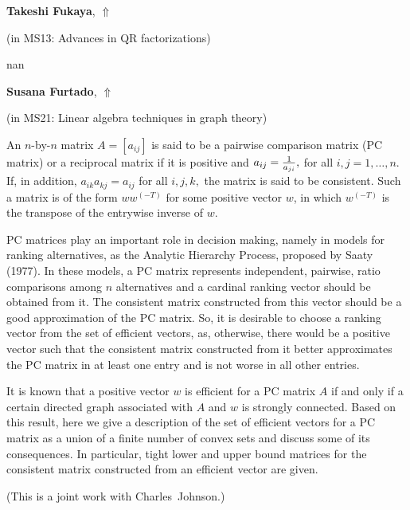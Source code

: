 \documentclass[ILAS2025-program.tex]{subfiles}
\begin{document}
     \hypertarget{down0340}{}\begin{ilasabstract}
    
    \textbf{Takeshi Fukaya},  \hfill \hyperlink{up0340}{$\Uparrow$}
    
    (in {\color{mstitle}MS13: Advances in QR factorizations})
        
        \mtskip
    nan\end{ilasabstract}
     \hypertarget{down0169}{}\begin{ilasabstract}
    
    \textbf{Susana Furtado},  \hfill \hyperlink{up0169}{$\Uparrow$}
    
    (in {\color{mstitle}MS21: Linear algebra techniques in graph theory})
        
        \mtskip
    An $n$-by-$n$ matrix $A=[a_{ij}]$ is said to be a pairwise comparison matrix (PC matrix)
or a reciprocal matrix if it is positive and $a_{ij}=\frac{1}{%
a_{ji}},$ for all $i,j=1,\ldots ,n.$ If, in addition, $a_{ik}a_{kj}=a_{ij}$ for
all $i,j,k,$ the matrix is said to be consistent. Such a matrix is of the
form $ww^{(-T)}$ for some positive vector $w$, in which $w^{(-T)}$ is the transpose of the entrywise
inverse of $w$.

PC matrices play an important role in decision making, namely in models for ranking
alternatives, as the Analytic Hierarchy Process,  proposed by Saaty (1977). 
In these models, a PC matrix represents independent, pairwise, ratio
comparisons among $n$ alternatives and a cardinal ranking vector should be
obtained from it. The consistent matrix constructed from this vector should
be a good approximation of the PC matrix. So, it is desirable to choose a
ranking vector from the set of efficient vectors, as, otherwise, there would
be a positive vector such that the consistent matrix constructed from it
better approximates the PC matrix in at least one entry and is not worse in
all other entries. 

It is known that a positive vector $w$ is efficient for a PC matrix $A$ if
and only if a certain directed graph associated with $A$ and $w$ is strongly
connected. Based on this result, here we give a description of the set of
efficient vectors for a PC matrix as a union of a finite number of
convex sets and discuss some of its consequences. In particular, tight lower
and upper bound matrices for the consistent matrix constructed from an
efficient vector are given. 

(This is a joint work with Charles~Johnson.) 
\end{ilasabstract}
\end{document}
